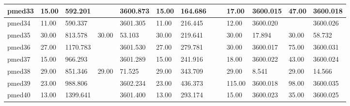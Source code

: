 \begin{landscape}
\begin{table}[t]
{\begin{tabular}{|l|l|l|l|l|l|l|l|l|l|l|l|l|}
pmed33 & 15.00 & 592.201 & & 3600.873 & 15.00 & 164.686 & & & 17.00 & 3600.015 & 47.00 & 3600.018 \\ \hline
pmed34 & 11.00 & 590.337 & & 3601.305 & 11.00 & 216.445 & & & 12.00 & 3600.020 & & 3600.026 \\ \hline
pmed35 & 30.00 & 813.578 & 30.00 & 53.103 & 30.00 & 219.641 & & & 30.00 & 17.894 & 30.00 & 58.732 \\ \hline
pmed36 & 27.00 & 1170.783 & & 3601.530 & 27.00 & 279.781 & & & 30.00 & 3600.017 & 75.00 & 3600.031 \\ \hline
pmed37 & 15.00 & 966.293 & & 3601.289 & 15.00 & 241.916 & & & 18.00 & 3600.022 & 43.00 & 3600.024 \\ \hline
pmed38 & 29.00 & 851.346 & 29.00 & 71.525 & 29.00 & 343.709 & & & 29.00 & 8.541 & 29.00 & 14.566 \\ \hline
pmed39 & 23.00 & 988.806 & & 3602.234 & 23.00 & 436.373 & & & 115.00 & 3600.018 & 98.00 & 3600.035 \\ \hline
pmed40 & 13.00 & 1399.641 & & 3601.400 & 13.00 & 293.174 & & & 15.00 & 3600.023 & 35.00 & 3600.025 \\ \hline
\end{tabular}}
\end{table}
\end{landscape}
